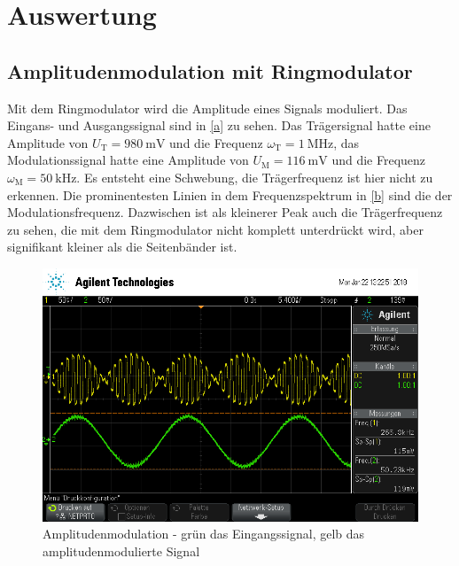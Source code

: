 \section{Auswertung}

\subsection{Amplitudenmodulation mit Ringmodulator}

Mit dem Ringmodulator wird die Amplitude eines Signals moduliert. Das Eingans- und Ausgangssignal sind in \autoref{a} zu sehen. Das Trägersignal hatte eine Amplitude von $U_\text{T}=\SI{980}{\milli\volt}$ und die Frequenz $\omega_\text{T}=\SI{1}{\mega\hertz}$, das Modulationssignal hatte eine Amplitude von $U_\text{M}=\SI{116}{\milli\volt}$ und die Frequenz $\omega_\text{M}=\SI{50}{\kilo\hertz}$. Es entsteht eine Schwebung, die Trägerfrequenz ist hier nicht zu erkennen. Die prominentesten Linien in dem Frequenzspektrum in \autoref{b} sind die der Modulationsfrequenz. Dazwischen ist als kleinerer Peak auch die Trägerfrequenz zu sehen, die mit dem Ringmodulator nicht komplett unterdrückt wird, aber signifikant kleiner als die Seitenbänder ist.

\begin{figure}
	\centering
	\includegraphics[width=\textwidth]{img/a_scope_230.png}
	\caption{Amplitudenmodulation - grün das Eingangssignal, gelb das amplitudenmodulierte Signal}
	\label{a}
\end{figure}

